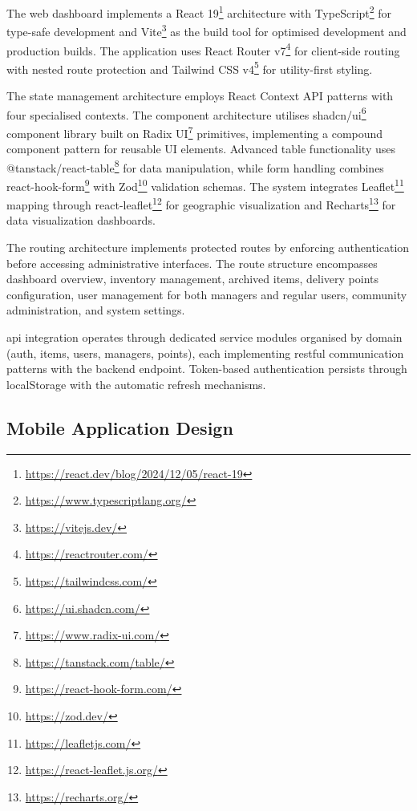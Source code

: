 The web dashboard implements a React 19\footnote{\url{https://react.dev/blog/2024/12/05/react-19}} architecture with TypeScript\footnote{\url{https://www.typescriptlang.org/}} for type-safe development and Vite\footnote{\url{https://vitejs.dev/}} as the build tool for optimised development and production builds. The application uses React Router v7\footnote{\url{https://reactrouter.com/}} for client-side routing with nested route protection and Tailwind CSS v4\footnote{\url{https://tailwindcss.com/}} for utility-first styling.

The state management architecture employs React Context API patterns with four specialised contexts. The component architecture utilises shadcn/ui\footnote{\url{https://ui.shadcn.com/}} component library built on Radix UI\footnote{\url{https://www.radix-ui.com/}} primitives, implementing a compound component pattern for reusable UI elements. Advanced table functionality uses @tanstack/react-table\footnote{\url{https://tanstack.com/table/}} for data manipulation, while form handling combines react-hook-form\footnote{\url{https://react-hook-form.com/}} with Zod\footnote{\url{https://zod.dev/}} validation schemas. The system integrates Leaflet\footnote{\url{https://leafletjs.com/}} mapping through react-leaflet\footnote{\url{https://react-leaflet.js.org/}} for geographic visualization and Recharts\footnote{\url{https://recharts.org/}} for data visualization dashboards.

The routing architecture implements protected routes by enforcing authentication before accessing administrative interfaces. The route structure encompasses dashboard overview, inventory management, archived items, delivery points configuration, user management for both managers and regular users, community administration, and system settings.


\ac{api} integration operates through dedicated service modules organised by domain (auth, items, users, managers, points), each implementing \ac{rest}ful communication patterns with the backend endpoint. Token-based authentication persists through localStorage with the automatic refresh mechanisms.

\subsection{Mobile Application Design} \label{subsection:mobile_application}

